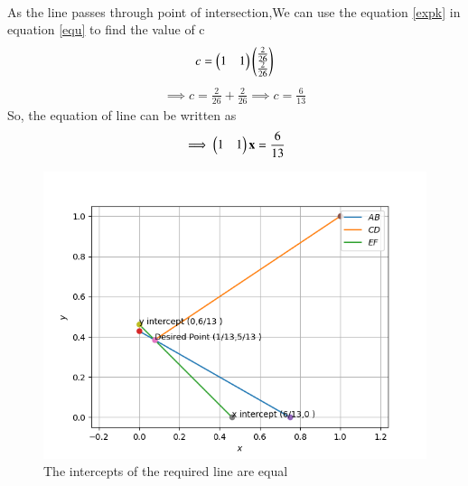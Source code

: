 \documentclass[journal,12pt,twocolumn]{IEEEtran}
\begin{document}
\begin{flushleft}
\begin{align}
    \end{align}
    As the line passes through point of intersection,We can use the equation \eqref{expk} in equation \eqref{equ} to find the value of c\\
    \begin{align}
    c=
    \begin{pmatrix}1 & 1\end{pmatrix}
    \begin{pmatrix}\frac{2}{26} \\  
    	\frac{2}{26} \end{pmatrix}
    \end{align}
    \begin{align}
    \implies c=\frac{2}{26}+\frac{2}{26}
    \implies c=\frac{6}{13}
    \end{align}
    So, the equation of line can be written as
    \begin{align}
    \implies
    \begin{pmatrix}1 & 1\end{pmatrix}
    	{\mathbf{x}} = \frac{6}{13}
    \end{align}
    \begin{figure}[!ht]
    \centering
    \includegraphics[width=\columnwidth]{Assignment_1}
     \caption{The intercepts of the required line are equal}
    \end{figure}
    \end{flushleft}
    
\end{document}
